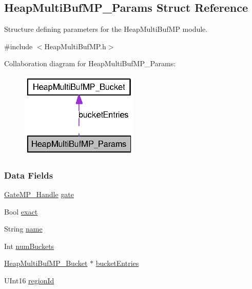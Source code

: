 \subsection{Heap\-Multi\-Buf\-M\-P\-\_\-\-Params Struct Reference}
\label{struct_heap_multi_buf_m_p___params}


Structure defining parameters for the Heap\-Multi\-Buf\-M\-P module.  




{\ttfamily \#include $<$Heap\-Multi\-Buf\-M\-P.\-h$>$}



Collaboration diagram for Heap\-Multi\-Buf\-M\-P\-\_\-\-Params\-:
\nopagebreak
\begin{figure}[H]
\begin{center}
\leavevmode
\includegraphics[width=159pt]{struct_heap_multi_buf_m_p___params__coll__graph}
\end{center}
\end{figure}
\subsubsection*{Data Fields}
\begin{DoxyCompactItemize}
\item 
\hyperlink{_gate_m_p_8h_ad5bb259f928a14e98d973334bc60ebb3}{Gate\-M\-P\-\_\-\-Handle} \hyperlink{struct_heap_multi_buf_m_p___params_a3c5f4bb4ecfb525299208a686c27cbfd}{gate}
\item 
Bool \hyperlink{struct_heap_multi_buf_m_p___params_a3ed83d3de19f3fd04062229fe6c693f7}{exact}
\item 
String \hyperlink{struct_heap_multi_buf_m_p___params_ac7a5994ab0dd02e88d3ad16e23b1a548}{name}
\item 
Int \hyperlink{struct_heap_multi_buf_m_p___params_a30eef328df3b8f69f50a013defb5fbb1}{num\-Buckets}
\item 
\hyperlink{struct_heap_multi_buf_m_p___bucket}{Heap\-Multi\-Buf\-M\-P\-\_\-\-Bucket} $\ast$ \hyperlink{struct_heap_multi_buf_m_p___params_ac130e0ad7fad30d9c759af90984dee8b}{bucket\-Entries}
\item 
U\-Int16 \hyperlink{struct_heap_multi_buf_m_p___params_aa3c641a64db9b4ff0c93f9a0c265f8d7}{region\-Id}
\end{DoxyCompactItemize}


